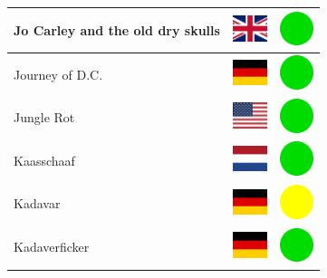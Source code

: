 \documentclass[12pt, a4paper, twoside]{report}
\begin{document}
\begin{center}
\begin{longtable}{|p{5cm}|p{2cm}|p{2cm}|}
 Jo Carley and the old dry skulls                           & \includegraphics[width=1cm]{../4x3/gb} &   \includegraphics[width=1cm]{../likes/y} \\ \hline
 Journey of D.C.                                            & \includegraphics[width=1cm]{../4x3/de} &   \includegraphics[width=1cm]{../likes/y} \\ \hline
 Jungle Rot                                                 & \includegraphics[width=1cm]{../4x3/us} &   \includegraphics[width=1cm]{../likes/y} \\ \hline
 Kaasschaaf                                                 & \includegraphics[width=1cm]{../4x3/nl} &   \includegraphics[width=1cm]{../likes/y} \\ \hline
 Kadavar                                                    & \includegraphics[width=1cm]{../4x3/de} &   \includegraphics[width=1cm]{../likes/m} \\ \hline
 Kadaverficker                                              & \includegraphics[width=1cm]{../4x3/de} &   \includegraphics[width=1cm]{../likes/y} \\ \hline

\end{longtable}
\end{center}
\end{document}
